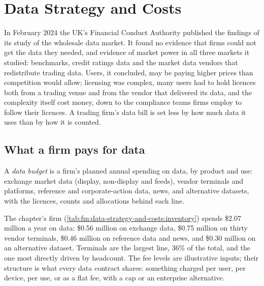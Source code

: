 \chapter{Data Strategy and Costs}\label{ch:fm:data-strategy-and-costs}

In February 2024 the UK's Financial Conduct Authority published the findings of its study of the wholesale data market. It found no evidence that
firms could not get the data they needed, and evidence of market power in all three markets it studied: benchmarks, credit ratings data and the
market data vendors that redistribute trading data. Users, it concluded, may be paying higher prices than competition would allow; licensing was
complex, many users had to hold licences both from a trading venue and from the vendor that delivered its data, and the complexity itself cost money,
down to the compliance teams firms employ to follow their licences. A trading firm's data bill is set less by how much data it uses than by how it
is counted.

\section{What a firm pays for data}

\begin{definition}\label{def:fm:data-strategy-and-costs:budget}
A \emph{data budget} is a firm's planned annual spending on data, by product and use: exchange market data (display,
non-display and feeds), vendor terminals and platforms, reference and corporate-action data, news, and alternative datasets, with the licences,
counts and allocations behind each line.
\end{definition}

The chapter's firm (\cref{tab:fm:data-strategy-and-costs:inventory}) spends \$2.07 million a year on data: \$0.56 million on exchange data, \$0.75
million on thirty vendor terminals, \$0.46 million on reference data and news, and \$0.30 million on an alternative dataset. Terminals are the largest
line, 36\% of the total, and the one most directly driven by headcount. The fee levels are illustrative inputs; their structure is what every data
contract shares: something charged per user, per device, per use, or as a flat fee, with a cap or an enterprise alternative.

